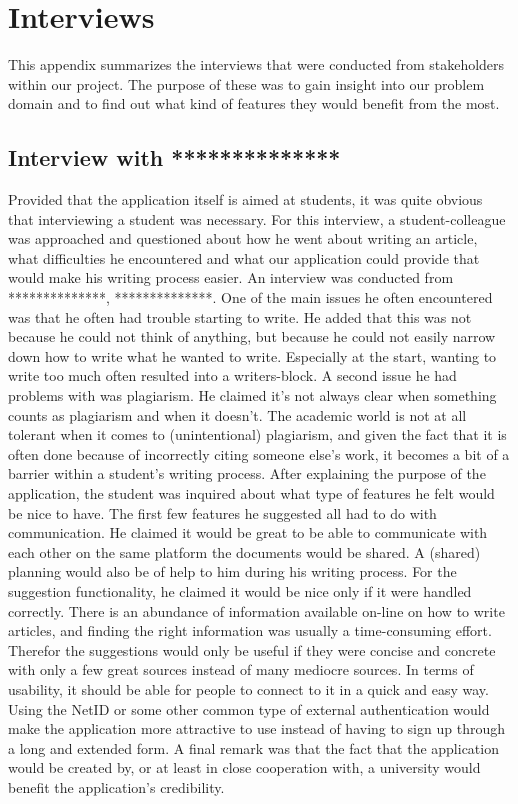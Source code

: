 \chapter{Interviews}    
 This appendix summarizes the interviews that were conducted from stakeholders within our project. The purpose of these was to gain insight into our problem domain and to find out what kind of features they would benefit from the most.

\section{Interview with **************}
Provided that the application itself is aimed at students, it was quite obvious that interviewing a student was necessary. For this interview, a student-colleague was approached and questioned about how he went about writing an article, what difficulties he encountered and what our application could provide that would make his writing process easier. An interview was conducted from **************, **************.
One of the main issues he often encountered was that he often had trouble starting to write. He added that this was not because he could not think of anything, but because he could not easily narrow down how to write what he wanted to write. Especially at the start, wanting to write too much often resulted into a writers-block.
A second issue he had problems with was plagiarism. He claimed it's not always clear when something counts as plagiarism and when it doesn't. The academic world is not at all tolerant when it comes to (unintentional) plagiarism, and given the fact that it is often done because of incorrectly citing someone else's work, it becomes a bit of a barrier within a student's writing process.
After explaining the purpose of the application, the student was inquired about what type of features he felt would be nice to have. The first few features he suggested all had to do with communication. He claimed it would be great to be able to communicate with each other on the same platform the documents would be shared. A (shared) planning would also be of help to him during his writing process. For the suggestion functionality, he claimed it would be nice only if it were handled correctly. There is an abundance of information available on-line on how to write articles, and finding the right information was usually a time-consuming effort. Therefor the suggestions would only be useful if they were concise and concrete with only a few great sources instead of many mediocre sources. 
In terms of usability, it should be able for people to connect to it in a quick and easy way. Using the NetID or some other common type of external authentication would make the application more attractive to use instead of having to sign up through a long and extended form. A final remark was that the fact that the application would be created by, or at least in close cooperation with, a university would benefit the application's credibility.


